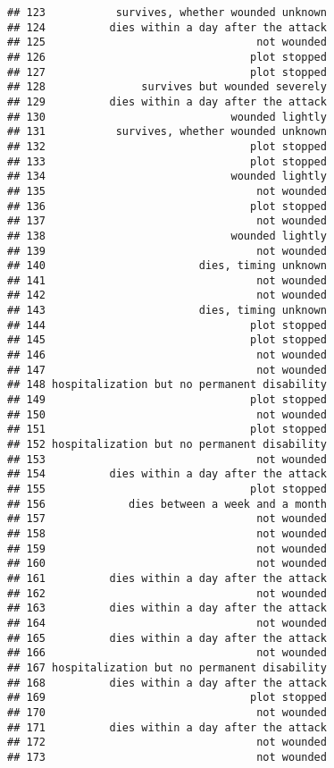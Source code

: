 \documentclass[
]{article}
\begin{document}
\begin{verbatim}
## 123           survives, whether wounded unknown
## 124          dies within a day after the attack
## 125                                 not wounded
## 126                                plot stopped
## 127                                plot stopped
## 128               survives but wounded severely
## 129          dies within a day after the attack
## 130                             wounded lightly
## 131           survives, whether wounded unknown
## 132                                plot stopped
## 133                                plot stopped
## 134                             wounded lightly
## 135                                 not wounded
## 136                                plot stopped
## 137                                 not wounded
## 138                             wounded lightly
## 139                                 not wounded
## 140                        dies, timing unknown
## 141                                 not wounded
## 142                                 not wounded
## 143                        dies, timing unknown
## 144                                plot stopped
## 145                                plot stopped
## 146                                 not wounded
## 147                                 not wounded
## 148 hospitalization but no permanent disability
## 149                                plot stopped
## 150                                 not wounded
## 151                                plot stopped
## 152 hospitalization but no permanent disability
## 153                                 not wounded
## 154          dies within a day after the attack
## 155                                plot stopped
## 156             dies between a week and a month
## 157                                 not wounded
## 158                                 not wounded
## 159                                 not wounded
## 160                                 not wounded
## 161          dies within a day after the attack
## 162                                 not wounded
## 163          dies within a day after the attack
## 164                                 not wounded
## 165          dies within a day after the attack
## 166                                 not wounded
## 167 hospitalization but no permanent disability
## 168          dies within a day after the attack
## 169                                plot stopped
## 170                                 not wounded
## 171          dies within a day after the attack
## 172                                 not wounded
## 173                                 not wounded

\end{verbatim}
\end{document}
